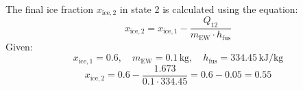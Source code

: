 The final ice fraction \( x_{\text{ice},2} \) in state 2 is calculated using the equation:  
\[
x_{\text{ice},2} = x_{\text{ice},1} - \frac{Q_{12}}{m_{\text{EW}} \cdot h_{\text{fus}}}
\]  
Given:  
\[
x_{\text{ice},1} = 0.6, \quad m_{\text{EW}} = 0.1 \, \text{kg}, \quad h_{\text{fus}} = 334.45 \, \text{kJ/kg}
\]  
\[
x_{\text{ice},2} = 0.6 - \frac{1.673}{0.1 \cdot 334.45} = 0.6 - 0.05 = 0.55
\]